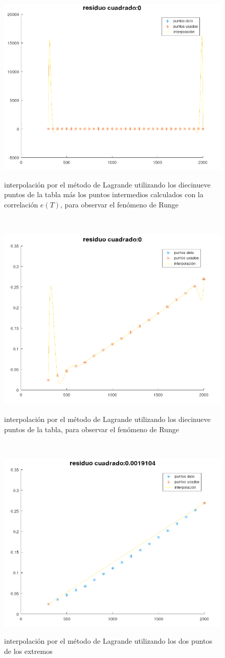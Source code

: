 \documentclass{article}
\begin{document}
\begin{figure}[H]
    \centering
    \includegraphics[width=0.7\linewidth]{35.png}
    \label{fig:enter-label}
    \caption{interpolación por el método de Lagrande utilizando los diecinueve puntos de la tabla más los puntos intermedios calculados con la correlación $e(T)$, para observar el fenómeno de Runge}
\end{figure}\\

\begin{figure}[H]
    \centering
    \includegraphics[width=0.7\linewidth]{19.png}
    \label{fig:enter-label}
    \caption{interpolación por el método de Lagrande utilizando los diecinueve puntos de la tabla, para observar el fenómeno de Runge}
\end{figure}\\

\begin{figure}[H]
    \centering
    \includegraphics[width=0.7\linewidth]{2.png}
    \label{fig:enter-label}
    \caption{interpolación por el método de Lagrande utilizando los dos puntos de los extremos}
\end{figure}\\
\end{document}
